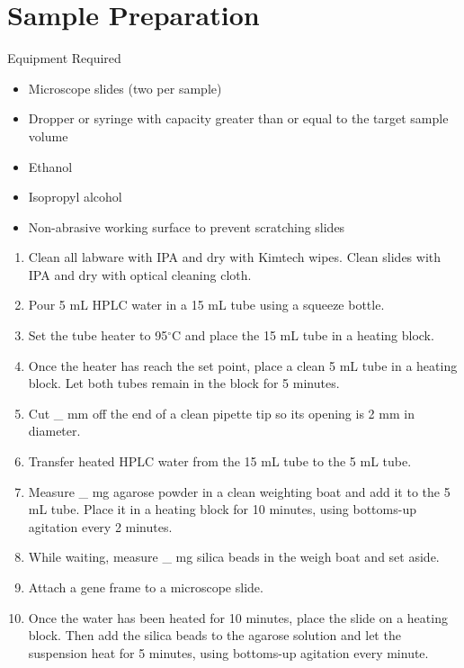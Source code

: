 \section{Sample Preparation}

Equipment Required
\begin{itemize}
    \item Microscope slides (two per sample)
    \item Dropper or syringe with capacity greater than or equal to the target sample volume
    \item Ethanol
    \item Isopropyl alcohol
    \item Non-abrasive working surface to prevent scratching slides
\end{itemize}

\begin{enumerate}
    \item Clean all labware with IPA and dry with Kimtech wipes. Clean slides with IPA and dry with optical cleaning cloth.
    
    \item Pour 5 mL HPLC water in a 15 mL tube using a squeeze bottle.

    \item Set the tube heater to 95$^\circ$C and place the 15 mL tube in a heating block.

    \item Once the heater has reach the set point, place a clean 5 mL tube in a heating block. Let both tubes remain in the block for 5 minutes.

    \item Cut \_ mm off the end of a clean pipette tip so its opening is 2 mm in diameter.

    \item Transfer heated HPLC water from the 15 mL tube to the 5 mL tube.

    \item Measure \_ mg agarose powder in a clean weighting boat and add it to the 5 mL tube. Place it in a heating block for 10 minutes, using bottoms-up agitation every 2 minutes.

    \item While waiting, measure \_ mg silica beads in the weigh boat and set aside.

    \item Attach a gene frame to a microscope slide.

    \item Once the water has been heated for 10 minutes, place the slide on a heating block. Then add the silica beads to the agarose solution and let the suspension heat for 5 minutes, using bottoms-up agitation every minute.


\end{enumerate}
